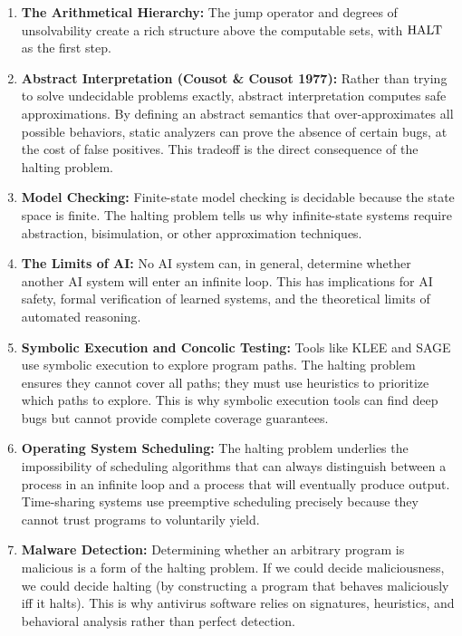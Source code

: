 \begin{enumerate}
\item \textbf{The Arithmetical Hierarchy:} The jump operator and degrees of unsolvability create a rich structure above the computable sets, with $\text{HALT}$ as the first step.

\item \textbf{Abstract Interpretation (Cousot \& Cousot 1977):} Rather than trying to solve undecidable problems exactly, abstract interpretation computes safe approximations. By defining an abstract semantics that over-approximates all possible behaviors, static analyzers can prove the absence of certain bugs, at the cost of false positives. This tradeoff is the direct consequence of the halting problem.

\item \textbf{Model Checking:} Finite-state model checking is decidable because the state space is finite. The halting problem tells us why infinite-state systems require abstraction, bisimulation, or other approximation techniques.

\item \textbf{The Limits of AI:} No AI system can, in general, determine whether another AI system will enter an infinite loop. This has implications for AI safety, formal verification of learned systems, and the theoretical limits of automated reasoning.

\item \textbf{Symbolic Execution and Concolic Testing:} Tools like KLEE and SAGE use symbolic execution to explore program paths. The halting problem ensures they cannot cover all paths; they must use heuristics to prioritize which paths to explore. This is why symbolic execution tools can find deep bugs but cannot provide complete coverage guarantees.

\item \textbf{Operating System Scheduling:} The halting problem underlies the impossibility of scheduling algorithms that can always distinguish between a process in an infinite loop and a process that will eventually produce output. Time-sharing systems use preemptive scheduling precisely because they cannot trust programs to voluntarily yield.

\item \textbf{Malware Detection:} Determining whether an arbitrary program is malicious is a form of the halting problem. If we could decide maliciousness, we could decide halting (by constructing a program that behaves maliciously iff it halts). This is why antivirus software relies on signatures, heuristics, and behavioral analysis rather than perfect detection.


\end{enumerate}

